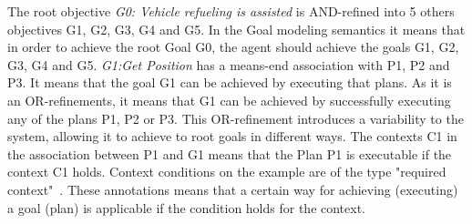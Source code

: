 The root objective \emph{G0: Vehicle refueling is assisted} is AND-refined into 5 others objectives G1, G2, G3, G4 and G5. In the Goal modeling semantics it means that in order to achieve the root Goal G0, the agent should achieve the goals G1, G2, G3, G4 and G5.
\emph{G1:Get Position} has a means-end association with P1, P2 and P3. It means that the goal G1 can be achieved by executing that plans. As it is an OR-refinements, it means that G1 can be achieved by successfully executing any of the plans P1, P2 or P3. This OR-refinement introduces a variability to the system, allowing it to achieve to root goals in different ways. The contexts C1 in the association between P1 and G1 means that the Plan P1 is executable if the context C1 holds.
Context conditions on the example are of the type "required context"~\cite{ali_goal-based_2010}. These annotations means that a certain way for achieving (executing) a goal (plan) is applicable if the condition holds for the context.




